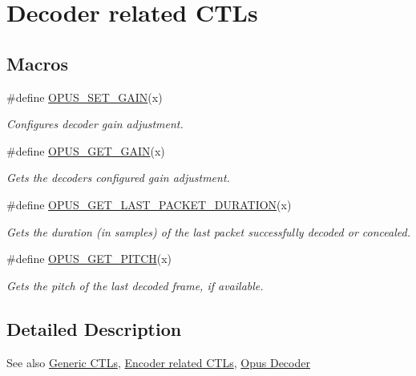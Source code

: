 \hypertarget{group__opus__decoderctls}{}\section{Decoder related C\+T\+Ls}
\label{group__opus__decoderctls}
\subsection*{Macros}
\begin{DoxyCompactItemize}
\item 
\#define \hyperlink{group__opus__decoderctls_ga8ddb6fa694efa2c7e95ef51addc70dac}{O\+P\+U\+S\+\_\+\+S\+E\+T\+\_\+\+G\+A\+IN}(x)
\begin{DoxyCompactList}\small\item\em Configures decoder gain adjustment. \end{DoxyCompactList}\item 
\#define \hyperlink{group__opus__decoderctls_ga00ca8b4bd753a837f143ebd8ed63d247}{O\+P\+U\+S\+\_\+\+G\+E\+T\+\_\+\+G\+A\+IN}(x)
\begin{DoxyCompactList}\small\item\em Gets the decoder\textquotesingle{}s configured gain adjustment. \end{DoxyCompactList}\item 
\#define \hyperlink{group__opus__decoderctls_ga8f3d070f56b75f2a7af54e5776b387fa}{O\+P\+U\+S\+\_\+\+G\+E\+T\+\_\+\+L\+A\+S\+T\+\_\+\+P\+A\+C\+K\+E\+T\+\_\+\+D\+U\+R\+A\+T\+I\+ON}(x)
\begin{DoxyCompactList}\small\item\em Gets the duration (in samples) of the last packet successfully decoded or concealed. \end{DoxyCompactList}\item 
\#define \hyperlink{group__opus__decoderctls_gaa89fc25eb35fc31a02b508562dd83820}{O\+P\+U\+S\+\_\+\+G\+E\+T\+\_\+\+P\+I\+T\+CH}(x)
\begin{DoxyCompactList}\small\item\em Gets the pitch of the last decoded frame, if available. \end{DoxyCompactList}\end{DoxyCompactItemize}


\subsection{Detailed Description}
\begin{DoxySeeAlso}{See also}
\hyperlink{group__opus__genericctls}{Generic C\+T\+Ls}, \hyperlink{group__opus__encoderctls}{Encoder related C\+T\+Ls}, \hyperlink{group__opus__decoder}{Opus Decoder} 
\end{DoxySeeAlso}


